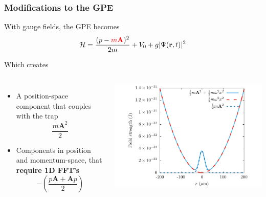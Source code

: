 \documentclass{beamer}
\begin{document}
\begin{frame}
\frametitle{Modifications to the GPE}
With gauge fields, the GPE becomes
\begin{equation*}
\mathcal{ H} = \frac{(p-{\color{red}{m\mathbf{A}}} )^2}{2m} + V_0 + g|\Psi(\mathbf{r},t)|^2
\end{equation*}

Which creates

\begin{columns}
\begin{itemize}
\item A position-space component that couples with the trap
$$
\frac{m\mathbf{A}^2}{2}
$$

\item Components in position and momentum-space, that \textbf{require 1D FFT's}
$$
-\left(\frac{p\mathbf{A} + \mathbf{A}p}{2}\right)
$$
\end{itemize}
\includegraphics[width=1.1\textwidth]{../data/splitop/gauge/check.pdf}
\end{columns}

\end{frame}
\end{document}
